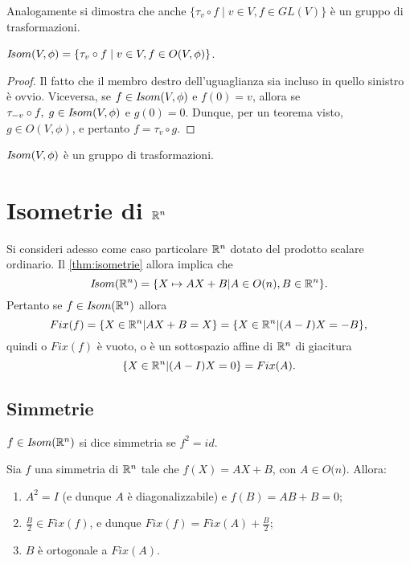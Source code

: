  \begin{remark}
 Analogamente si dimostra che anche $\{\tau_v\circ f\;|\;v\in V,f\in GL(V)\}$ 
 è un gruppo di trasformazioni.
 \end{remark}
 
 \begin{theorem}
 \label{thm:isometrie}
 $I\!som( V,\phi)=\{\tau_v\circ f\;|\;v\in V,f\in O(V,\phi)\}$.
 \end{theorem}
 
 \begin{proof}
 Il fatto che il membro destro dell'uguaglianza sia incluso in quello sinistro è ovvio.
 Viceversa, se $f\in I\!som( V,\phi)$  e  $f(0)=v$, allora se  $\tau_{-v}\circ f,\; g\in I\!som( V,\phi)$ e
 $g(0)=0$. Dunque, per un teorema visto, $g\in O(V,\phi)$, e pertanto $f=\tau_v\circ g$.
  \end{proof}
 
 \begin{corollary}
$I\!som( V,\phi)$ è un gruppo di trasformazioni.
 \end{corollary}
 
 
\section{Isometrie di $\mathbb R^n$}
 
 Si consideri adesso come caso particolare $\mathbb R^n$ dotato del prodotto scalare ordinario.
 Il \cref{thm:isometrie} allora implica che $$I\!som( \mathbb R^n)=\{X\mapsto AX+B|A\in O(n),B\in \mathbb R^n\}.$$
 Pertanto se $f\in I\!som( \mathbb R^n)$ allora $$Fix(f)=\{X\in \mathbb R^n|AX+B=X\}=\{X\in \mathbb R^n|(A-I)X=-B\},$$
 quindi o $Fix(f)$ è vuoto, o è un sottospazio affine di $\mathbb R^n$ di giacitura
 $$\{X\in \mathbb R^n|(A-I)X=0\}=Fix(A).$$
 
 
\subsection{Simmetrie}
 
 $f\in I\!som( \mathbb R^n)$ si dice simmetria se $f^2=id$.
 
 \begin{proposition}
 Sia $f$ una simmetria di $\mathbb R^n$ tale che $f(X)=AX+B$, con $A\in O(n$).
 Allora:
 \begin{enumerate}[label=\bf\Roman*)]
	\item $A^2=I$ (e dunque $A$ è diagonalizzabile) e $f(B)=AB+B=0$;\label{sim:p}
	\item $\frac{B}{2}\in Fix(f)$, e dunque $Fix(f)=Fix(A)+\frac{B}{2}$;
	\item $B$ è ortogonale a $Fix(A)$.
 \end{enumerate}
 \end{proposition}
 
